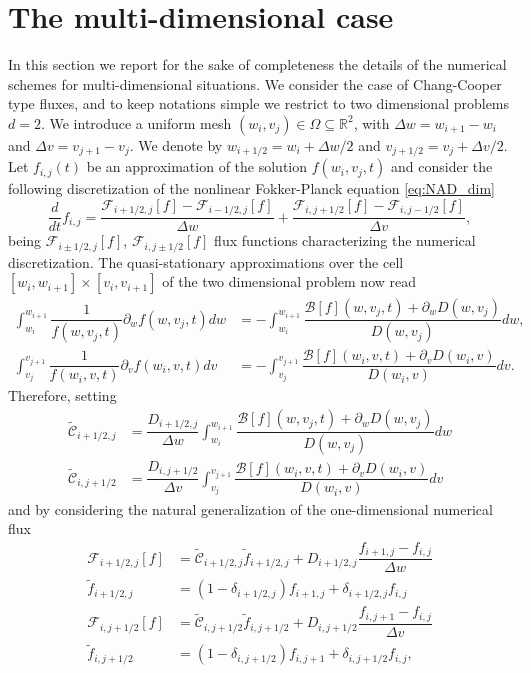 \documentclass[a4paper]{article}
\theoremstyle{remark}\newtheorem{remark}{Remark}
\newcommand{\RR}{\mathbb{R}}
\newcommand{\F}{\mathcal{F}}
\newcommand{\B}{\mathcal{B}}
\newcommand{\C}{\mathcal{C}}
\newcommand{\be}{\begin{equation}}
\newcommand{\ee}{\end{equation}}
\begin{document}
\section{The multi-dimensional case}\label{sec:2D}
In this section we report for the sake of completeness the details of the numerical schemes for multi-dimensional situations. We consider the case of Chang-Cooper type fluxes, and to keep notations simple we restrict to two dimensional problems $d=2$. We introduce a uniform mesh $(w_i,v_j) \in\Omega\subseteq \RR^2$, with $\Delta w=w_{i+1}-w_{i}$ and $\Delta v=v_{j+1}-v_{j}$. We denote by $w_{i+1/2}=w_i+\Delta w/2$ and $v_{j+1/2}=v_j+\Delta v/2$. Let $f_{i,j}(t)$ be an approximation of the solution $f(w_i,v_j,t)$ and consider the following discretization of the nonlinear Fokker-Planck equation \eqref{eq:NAD_dim}  
\be\label{eq:eqflux2D}
\frac{d}{dt} f_{i,j} = \dfrac{\F_{i+1/2,j}[f]-\F_{i-1/2,j}[f]}{\Delta w}+\dfrac{\F_{i,j+1/2}[f]-\F_{i,j-1/2}[f]}{\Delta v},
\ee
being $\F_{i\pm1/2,j}[f]$, $\F_{i,j\pm1/2}[f]$ flux functions characterizing the numerical discretization. The quasi-stationary approximations over the cell $[w_i,w_{i+1}]\times[v_i,v_{i+1}]$ of the two dimensional problem now read
\[
\begin{split}
\int_{w_{i}}^{w_{i+1}} \dfrac{1}{f(w,v_j,t)}\partial_w f(w,v_j,t) dw&= -\int_{w_{i}}^{w_{i+1}}\dfrac{\B[f](w,v_j,t)+\partial_w D(w,v_j)}{D(w,v_j)}dw, \\
\int_{v_{j}}^{v_{j+1}} \dfrac{1}{f(w_i,v,t)}\partial_v f(w_i,v,t) dv&= -\int_{v_j}^{v_{j+1}}\dfrac{\B[f](w_i,v,t)+\partial_v D(w_i,v)}{D(w_i,v)}dv.
\end{split}
\]
Therefore, setting
\be\begin{split}
\tilde{\C}_{i+1/2,j} &= \dfrac{D_{i+1/2,j}}{\Delta w}\int_{w_i}^{w_{i+1}}\dfrac{\B[f](w,v_j,t)+\partial_{w}D(w,v_j)}{D(w,v_j)}dw\\
\tilde{\C}_{i,j+1/2} &= \dfrac{D_{i,j+1/2}}{\Delta v}\int_{v_j}^{v_{j+1}}\dfrac{\B[f](w_i,v,t)+\partial_{v}D(w_i,v)}{D(w_i,v)}dv
\end{split}\ee
and by considering the natural generalization of the one-dimensional numerical flux
\be\begin{split}\label{eq:F2D}
\F_{i+1/2,j}[f] &= \tilde{\C}_{i+1/2,j}\tilde{f}_{i+1/2,j}+D_{i+1/2,j}\dfrac{f_{i+1,j}-f_{i,j}}{\Delta w}\\
\tilde f_{i+1/2,j}& = (1-\delta_{i+1/2,j})f_{i+1,j}+\delta_{i+1/2,j}f_{i,j}\\
\F_{i,j+1/2}[f] &= \tilde{\C}_{i,j+1/2}\tilde{f}_{i,j+1/2}+D_{i,j+1/2}\dfrac{f_{i,j+1}-f_{i,j}}{\Delta v}\\
\tilde f_{i,j+1/2}& = (1-\delta_{i,j+1/2})f_{i,j+1}+\delta_{i,j+1/2}f_{i,j},
\end{split}\ee
\end{document}
